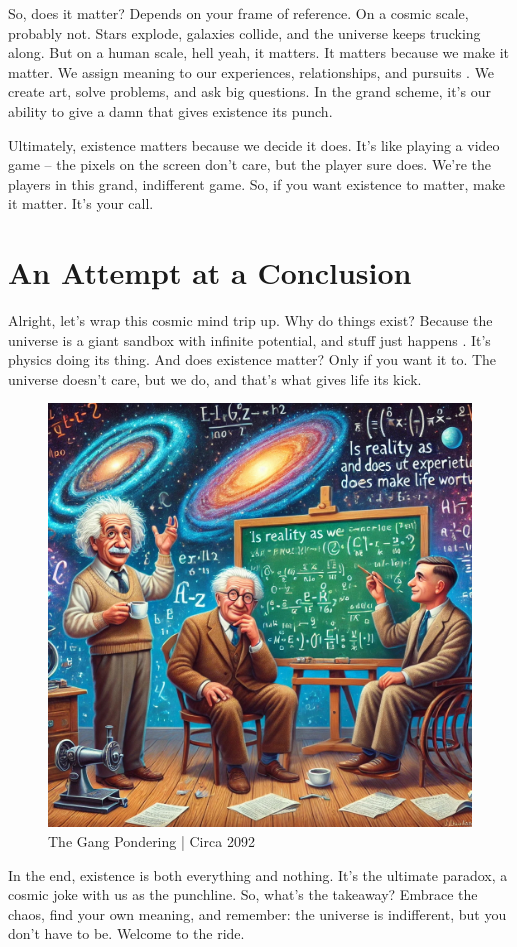 \documentclass{Axon}
\begin{document}
So, does it matter? Depends on your frame of reference. On a cosmic scale, probably not. Stars explode, galaxies collide, and the universe keeps trucking along. But on a human scale, hell yeah, it matters. It matters because we make it matter. We assign meaning to our experiences, relationships, and pursuits \cite{quantumTomfoolery2024}. We create art, solve problems, and ask big questions. In the grand scheme, it's our ability to give a damn that gives existence its punch.

Ultimately, existence matters because we decide it does. It’s like playing a video game – the pixels on the screen don’t care, but the player sure does. We’re the players in this grand, indifferent game. So, if you want existence to matter, make it matter. It's your call.
\section{An Attempt at a Conclusion}
Alright, let's wrap this cosmic mind trip up. Why do things exist? Because the universe is a giant sandbox with infinite potential, and stuff just happens \cite{quantumJokes}. It’s physics doing its thing. And does existence matter? Only if you want it to. The universe doesn’t care, but we do, and that’s what gives life its kick.

\begin{figure}[h]
    \centering
    \includegraphics[width=0.35\linewidth]{TheGang.jpeg}
    \caption{The Gang Pondering | Circa 2092}
    \label{fig:The Gang}
\end{figure}

In the end, existence is both everything and nothing. It’s the ultimate paradox, a cosmic joke with us as the punchline. So, what’s the takeaway? Embrace the chaos, find your own meaning, and remember: the universe is indifferent, but you don't have to be. Welcome to the ride.

\printbibliography
\end{document}
